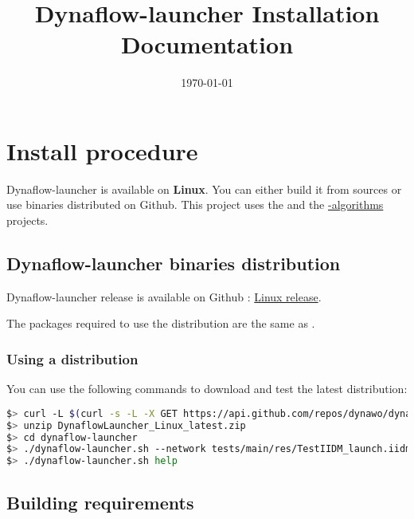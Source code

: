 \documentclass[a4paper, 12pt]{report}
\begin{document}
\title{Dynaflow-launcher Installation Documentation}
\date\today

\maketitle
\tableofcontents

\chapter{Install procedure}

Dynaflow-launcher is available on \textbf{Linux}.
You can either build it from sources or use binaries distributed on Github.
This project uses the \href{https://github.com/dynawo/dynawo}{\Dynawo}  and the \href{https://github.com/dynawo/dynawo-algorithms}{\Dynawo-algorithms} projects.

\section{Dynaflow-launcher binaries distribution}

Dynaflow-launcher release is available on Github : \href{https://github.com/dynawo/dynaflow-launcher/releases/download/v1.4.1/DynaFlowLauncher_Linux_v1.4.1.zip}{Linux release}.

The packages required to use the distribution are the same as \Dynawo.

\subsection{Using a distribution}

You can use the following commands to download and test the latest distribution:
\begin{lstlisting}[language=bash, breaklines=true, breakatwhitespace=false, columns=fullflexible]
$> curl -L $(curl -s -L -X GET https://api.github.com/repos/dynawo/dynaflow-launcher/releases/latest | grep "DynaFlowLauncher_Linux" | grep url | cut -d '"' -f 4) -o DynaflowLauncher_Linux_latest.zip
$> unzip DynaflowLauncher_Linux_latest.zip
$> cd dynaflow-launcher
$> ./dynaflow-launcher.sh --network tests/main/res/TestIIDM_launch.iidm --config tests/main/res/config_launch.json
$> ./dynaflow-launcher.sh help
\end{lstlisting}

\section{Building requirements}
\end{document}
